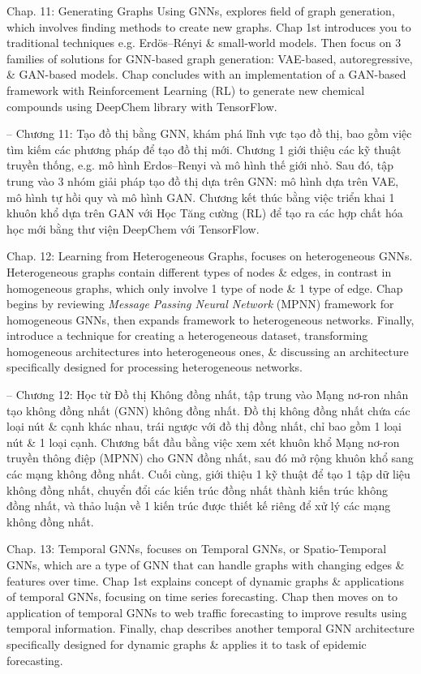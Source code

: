 \documentclass{article}
\begin{document}
\begin{itemize}
\begin{itemize}
        Chap. 11: Generating Graphs Using GNNs, explores field of graph generation, which involves finding methods to create new graphs. Chap 1st introduces you to traditional techniques e.g. Erd\"os--R\'enyi \& small-world models. Then focus on 3 families of solutions for GNN-based graph generation: VAE-based, autoregressive, \& GAN-based models. Chap concludes with an implementation of a GAN-based framework with Reinforcement Learning (RL) to generate new chemical compounds using DeepChem library with TensorFlow.

        -- Chương 11: Tạo đồ thị bằng GNN, khám phá lĩnh vực tạo đồ thị, bao gồm việc tìm kiếm các phương pháp để tạo đồ thị mới. Chương 1 giới thiệu các kỹ thuật truyền thống, e.g. mô hình Erdos--Renyi và mô hình thế giới nhỏ. Sau đó, tập trung vào 3 nhóm giải pháp tạo đồ thị dựa trên GNN: mô hình dựa trên VAE, mô hình tự hồi quy và mô hình GAN. Chương kết thúc bằng việc triển khai 1 khuôn khổ dựa trên GAN với Học Tăng cường (RL) để tạo ra các hợp chất hóa học mới bằng thư viện DeepChem với TensorFlow.

        Chap. 12: Learning from Heterogeneous Graphs, focuses on heterogeneous GNNs. Heterogeneous graphs contain different types of nodes \& edges, in contrast in homogeneous graphs, which only involve 1 type of node \& 1 type of edge. Chap begins by reviewing {\it Message Passing Neural Network} (MPNN) framework for homogeneous GNNs, then expands framework to heterogeneous networks. Finally, introduce a technique for creating a heterogeneous dataset, transforming homogeneous architectures into heterogeneous ones, \& discussing an architecture specifically designed for processing heterogeneous networks.

        -- Chương 12: Học từ Đồ thị Không đồng nhất, tập trung vào Mạng nơ-ron nhân tạo không đồng nhất (GNN) không đồng nhất. Đồ thị không đồng nhất chứa các loại nút \& cạnh khác nhau, trái ngược với đồ thị đồng nhất, chỉ bao gồm 1 loại nút \& 1 loại cạnh. Chương bắt đầu bằng việc xem xét khuôn khổ Mạng nơ-ron truyền thông điệp (MPNN) cho GNN đồng nhất, sau đó mở rộng khuôn khổ sang các mạng không đồng nhất. Cuối cùng, giới thiệu 1 kỹ thuật để tạo 1 tập dữ liệu không đồng nhất, chuyển đổi các kiến trúc đồng nhất thành kiến trúc không đồng nhất, và thảo luận về 1 kiến trúc được thiết kế riêng để xử lý các mạng không đồng nhất.

        Chap. 13: Temporal GNNs, focuses on Temporal GNNs, or Spatio-Temporal GNNs, which are a type of GNN that can handle graphs with changing edges \& features over time. Chap 1st explains concept of dynamic graphs \& applications of temporal GNNs, focusing on time series forecasting. Chap then moves on to application of temporal GNNs to web traffic forecasting to improve results using temporal information. Finally, chap describes another temporal GNN architecture specifically designed for dynamic graphs \& applies it to task of epidemic forecasting.


\end{itemize}
\end{itemize}
\end{document}
